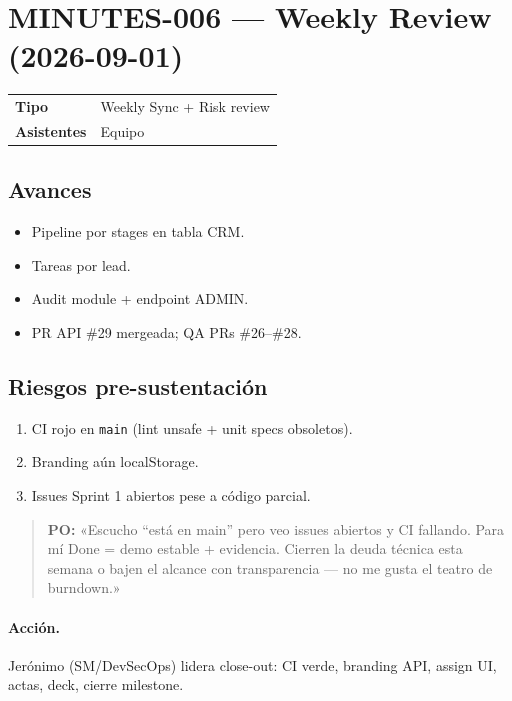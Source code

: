 \documentclass[11pt,a4paper]{article}
\begin{document}
\section{MINUTES-006 — Weekly Review (2026-09-01)}
\begin{tabular}{@{}ll@{}}
\textbf{Tipo} & Weekly Sync + Risk review \\
\textbf{Asistentes} & Equipo \\
\end{tabular}

\subsection*{Avances}
\begin{itemize}[leftmargin=*]
  \item Pipeline por stages en tabla CRM.
  \item Tareas por lead.
  \item Audit module + endpoint ADMIN.
  \item PR API \#29 mergeada; QA PRs \#26--\#28.
\end{itemize}

\subsection*{Riesgos pre-sustentación}
\begin{enumerate}[leftmargin=*]
  \item CI rojo en \texttt{main} (lint unsafe + unit specs obsoletos).
  \item Branding aún localStorage.
  \item Issues Sprint 1 abiertos pese a código parcial.
\end{enumerate}

\begin{quote}
\textcolor{po}{\textbf{PO:} «Escucho “está en main” pero veo issues abiertos y CI fallando. Para mí Done = demo estable + evidencia. Cierren la deuda técnica esta semana o bajen el alcance con transparencia — no me gusta el teatro de burndown.»}
\end{quote}

\paragraph{Acción.} Jerónimo (SM/DevSecOps) lidera close-out: CI verde, branding API, assign UI, actas, deck, cierre milestone.

\end{document}
